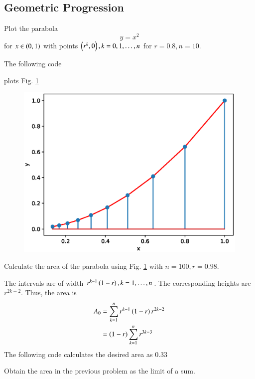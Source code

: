 \documentclass[journal,12pt,twocolumn]{IEEEtran}
\begin{document}
\subsection{Geometric Progression}
\begin{problem}
Plot the parabola
%
\begin{equation}
y = x^2
\end{equation}
%
for $x\in\left(0,1\right)$ with points $\left(r^k,0\right), k = 0,1,\dots,n$ for $r = 0.8, n = 10$.
\end{problem}
\solution
The following code
%

%
plots Fig. \ref{fig:parabola_area_gp}
\begin{figure}[!h]
\centering
\includegraphics[width=\columnwidth]{./figs/parabola_area_gp.eps}
\caption{}
\label{fig:parabola_area_gp}
\end{figure}
%
\begin{problem}
Calculate the area of the parabola using Fig. \ref{fig:parabola_area_gp} with $n = 100, r = 0.98$.
\end{problem}
\solution 
The intervals are of width $r^{k-1}\left(1-r\right), k = 1, \dots, n$.  The corresponding heights are $r^{2k-2}$.  Thus, the area is
%
\begin{align}
A_0 &= \sum_{k=1}^{n}r^{k-1}\left(1-r\right)r^{2k-2}
\\
&=\left(1-r\right)\sum_{k=1}^{n}r^{3k-3}
\end{align}
%
The following code calculates the desired area as 0.33

\begin{problem}
Obtain the area in the previous problem as the limit of a sum.
\end{problem}
\end{document}
